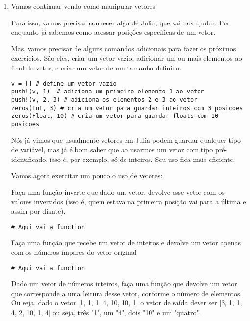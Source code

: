 \documentclass[a4paper]{article}
\begin{document}
\begin{enumerate}
\item Vamos continuar vendo como manipular vetores
\label{sec:org1e23a8b}

Para isso, vamos precisar conhecer algo de Julia, que vai
nos ajudar. Por enquanto já sabemos como acessar posições específicas
de um vetor.

Mas, vamos precisar de alguns comandos adicionais para fazer
os próximos exercícios. São eles, criar um vetor vazio, adicionar um
ou mais elementos ao final do vetor, e criar um vetor de um tamanho
definido.

\lstset{language=ein-julia,label= ,caption= ,captionpos=b,numbers=none}
\begin{lstlisting}
v = [] # define um vetor vazio
push!(v, 1)  # adiciona um primeiro elemento 1 ao vetor
push!(v, 2, 3) # adiciona os elementos 2 e 3 ao vetor
zeros(Int, 3) # cria um vetor para guardar inteiros com 3 posicoes
zeros(Float, 10) # cria um vetor para guardar floats com 10 posicoes
\end{lstlisting}

Nós já vimos que usualmente vetores em Julia podem guardar qualquer
tipo de variável, mas já é bom saber que ao usarmos um vetor com
tipo pré-identificado, isso é, por exemplo, só de inteiros. Seu
uso fica mais eficiente.

Vamos agora exercitar um pouco o uso de vetores:

Faça uma função inverte que dado um vetor, devolve esse vetor com os
valores invertidos (isso é, quem estava na primeira posição vai para
a última e assim por diante).

\lstset{language=ein-julia,label= ,caption= ,captionpos=b,numbers=none}
\begin{lstlisting}
# Aqui vai a function
\end{lstlisting}

Faça uma função que recebe um vetor de inteiros e devolve um vetor
apenas com os números ímpares do vetor original

\lstset{language=ein-julia,label= ,caption= ,captionpos=b,numbers=none}
\begin{lstlisting}
# Aqui vai a function
\end{lstlisting}

Dado um vetor de números inteiros, faça uma função que devolve um vetor que
corresponde a uma leitura desse vetor, conforme o número de elementos. Ou seja,
dado o vetor [1, 1, 1, 4, 10, 10, 1] o vetor de saída dever ser [3, 1, 1, 4, 2,
10, 1, 4] ou seja, três "1", um "4", dois "10" e um "quatro".


\end{enumerate}
\end{document}
